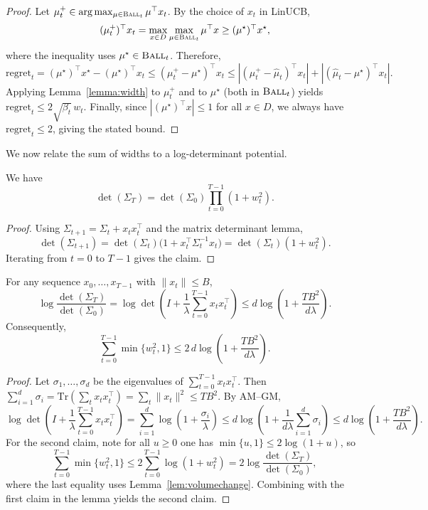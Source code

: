 \begin{proof}
Let $\mu_t^+\in\arg\max_{\mu\in\textsc{Ball}_t}\mu^\top x_t$.
By the choice of $x_t$ in LinUCB,
\[
(\mu_t^+)^\top x_t
=
\max_{x\in D}\max_{\mu\in\textsc{Ball}_t}\mu^\top x
\ge
(\mu^\star)^\top x^\star,
\]
where the inequality uses $\mu^\star\in\textsc{Ball}_t$.
Therefore,
\[
\mathrm{regret}_t
=(\mu^\star)^\top x^\star-(\mu^\star)^\top x_t
\le
(\mu_t^+-\mu^\star)^\top x_t
\le
|(\mu_t^+-\widehat{\mu}_t)^\top x_t| + |(\widehat{\mu}_t-\mu^\star)^\top x_t|.
\]
Applying Lemma~\ref{lemma:width} to $\mu_t^+$ and to $\mu^\star$ (both in $\textsc{Ball}_t$)
yields $\mathrm{regret}_t\le 2\sqrt{\beta_t}\, w_t$.
Finally, since $|(\mu^\star)^\top x|\le 1$ for all $x\in D$, we always have
$\mathrm{regret}_t\le 2$, giving the stated bound.
\end{proof}

We now relate the sum of widths to a log-determinant potential.

\begin{lemma}\label{lem:volumechange}
We have
\[
\det(\Sigma_T)
=
\det(\Sigma_0)\prod_{t=0}^{T-1}(1+w_t^2).
\]
\end{lemma}

\begin{proof}
Using $\Sigma_{t+1}=\Sigma_t+x_tx_t^\top$ and the matrix determinant lemma,
\[
\det(\Sigma_{t+1})
=
\det(\Sigma_t)\Big(1+x_t^\top \Sigma_t^{-1}x_t\Big)
=
\det(\Sigma_t)(1+w_t^2).
\]
Iterating from $t=0$ to $T-1$ gives the claim.
\end{proof}

\begin{lemma}\label{lem:detA}
For any sequence $x_0,\dots,x_{T-1}$ with $\|x_t\|\le B$,
\[
\log\frac{\det(\Sigma_T)}{\det(\Sigma_0)}
=
\log\det\!\left(I+\frac{1}{\lambda}\sum_{t=0}^{T-1}x_tx_t^\top\right)
\le
d\log\!\left(1+\frac{TB^2}{d\lambda}\right).
\]
Consequently,
\[
  \sum_{t=0}^{T-1}\min\{w_t^2,1\}
\leq 2\, d\log\!\left(1+\frac{TB^2}{d\lambda}\right).
\]
\end{lemma}

\begin{proof}
Let $\sigma_1,\dots,\sigma_d$ be the eigenvalues of $\sum_{t=0}^{T-1}x_tx_t^\top$.
Then $\sum_{i=1}^d\sigma_i=\mathrm{Tr}(\sum_t x_tx_t^\top)=\sum_t\|x_t\|^2\le TB^2$.
By AM--GM,
\[
\log\det\!\left(I+\frac{1}{\lambda}\sum_{t=0}^{T-1}x_tx_t^\top\right)
=
\sum_{i=1}^d \log\!\left(1+\frac{\sigma_i}{\lambda}\right)
\le
d\log\!\left(1+\frac{1}{d\lambda}\sum_{i=1}^d\sigma_i\right)
\le
d\log\!\left(1+\frac{TB^2}{d\lambda}\right).
\]
For the second claim, note for all $u\ge 0$ one has $\min\{u,1\}\le 2\log(1+u)$,
so
\[
\sum_{t=0}^{T-1}\min\{w_t^2,1\}
\le
2\sum_{t=0}^{T-1}\log(1+w_t^2)
=
2\log\frac{\det(\Sigma_T)}{\det(\Sigma_0)},
\]
where the last equality uses Lemma~\ref{lem:volumechange}.
Combining with the first claim in the lemma
yields the second claim.
\end{proof}

